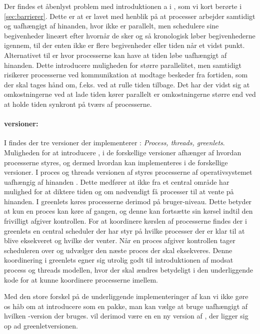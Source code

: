Der findes et åbenlyst problem med introduktionen a \des i \csp, som vi kort berørte i \cref{sec:barrierer}. Dette er at \csp er lavet med henblik på at processer arbejder samtidigt og uafhængigt af hinanden, hvor \des  ikke er parallelt, men schedulere sine begivenheder lineært efter hvornår de sker og så kronologisk løber begivenhederne igennem, til der enten ikke er flere begivenheder eller tiden når et vidst punkt. Alternativet til  \des  er \pdes hvor processerne kan have at tiden løbe uafhængigt af hinanden. Dette introducere muligheden for større parallelitet, men samtidigt risikerer processerne ved kommunikation at modtage beskeder fra fortiden, som der skal tages hånd om, f.eks. ved at rulle tiden tilbage. Det har der vidst sig at omkostningerne ved at lade tiden kører parallelt er omkostningerne større end ved at holde tiden synkront på tværs af processerne.
    
\paragraph*{\pycsp versioner:}I \pycsp findes der tre versioner der implementerer \csp: \emph{Process, threads, greenlets}\cite{Friborg2009}. Muligheden for at introducere \des, i de forskellige versioner afhænger af hvordan processerne styres, og dermed hvordan \des kan  implementeres i de forskellige versioner. I proces og threads versionen af \pycsp styres processerne af operativsystemet uafhængig af hinanden . Dette medfører at \pycsp ikke fra et central område har mulighed for at diktere tiden og om nødvendigt få processer til at vente på hinanden. I greenlets køres processerne derimod på bruger-niveau. Dette betyder at kun en proces kan køre af gangen, og denne kan fortsætte sin kørsel indtil den frivilligt afgiver kontrollen. For at koordinere kørslen af processerne findes der i greenlets en central scheduler der har styr på hvilke processer der er klar til at blive eksekveret og hvilke der venter. Når en proces afgiver kontrollen tager scheduleren over og udvælger den næste proces der skal eksekveres. Denne koordinering i greenlets  egner sig utrolig godt til introduktionen af \des modsat process og threads modellen, hvor der skal ændres betydeligt i den underliggende kode for at kunne koordinere processerne imellem. 

Med den store forskel på de underliggende implementeringer af \csp kan vi ikke gøre os håb om at introducere \des som en pakke, man kan vælge at bruge uafhængigt af hvilken \pycsp-version  der bruges. \Des vil derimod være en en ny version af \pycsp, der ligger sig op ad greenletversionen. 

